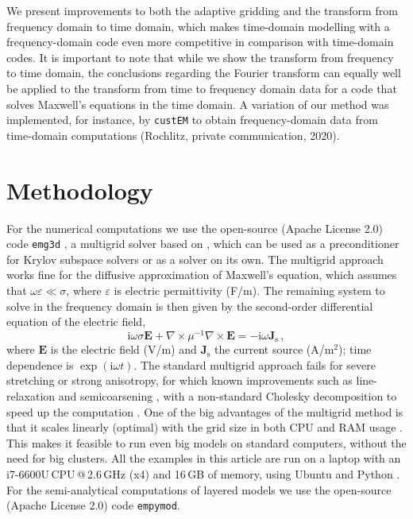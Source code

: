 \documentclass[onecolumn,extra,referee,camera]{gji}
\newcommand{\emg}[2]{\texttt{emg#1#2}\xspace}
\newcommand{\empymod}{\texttt{empymod}\xspace}
\newcommand{\custem}{\texttt{custEM}\xspace}
\begin{document}
We present improvements to both the adaptive gridding and the transform from
frequency domain to time domain, which makes time-domain modelling with a
frequency-domain code even more competitive in comparison with time-domain
codes. It is important to note that while we show the transform from frequency
to time domain, the conclusions regarding the Fourier transform can equally
well be applied to the transform from time to frequency domain data for a code
that solves Maxwell's equations in the time domain. A variation of our method
was implemented, for instance, by \custem \citep{GEO.19.Rochlitz} to obtain
frequency-domain data from time-domain computations (Rochlitz, private
communication, 2020).


\section{Methodology} %

For the numerical computations we use the open-source (Apache License 2.0) code
\emg3d \citep{JOSS.19.Werthmuller}, a multigrid solver based on
\cite{GP.06.Mulder}, which can be used as a preconditioner for Krylov subspace
solvers or as a solver on its own. The multigrid approach works fine for the
diffusive approximation of Maxwell's equation, which assumes that
$\omega\varepsilon \ll \sigma$, where $\varepsilon$ is electric permittivity
(F/m). The remaining system to solve in the frequency domain is then given by
the second-order differential equation of the electric field,
%
\begin{equation}
    \mathrm{i}\omega\sigma \mathbf{E} +
    \nabla \times \mu^{-1} \nabla \times \mathbf{E}
    = -\mathrm{i}\omega\mathbf{J}_\mathrm{s} \, ,
  \label{eq:maxwell}
\end{equation}
%
where $\mathbf{E}$ is the electric field (V/m) and $\mathbf{J}_\mathrm{s}$ the
current source (A/m$^2$); time dependence is $\exp(\mathrm{i}\omega t)$. The
standard multigrid approach fails for severe stretching or strong anisotropy,
for which \deleted{\emg3d has implemented }known improvements such as
line-relaxation and semicoarsening \citep{ECCFD.06.Jonsthovel} , with a non-standard Cholesky decomposition to speed up the
computation \citep{GEO.08.Mulder}. One of the big advantages of the multigrid
method is that it scales linearly (optimal) with the grid size in both CPU and
RAM usage \citep{B.Springer.20.Mulder}. This makes it feasible to run even big
models on standard computers, without the need for big clusters. All the
examples in this article are run on a laptop with an i7-6600U\,CPU\,@\,2.6\,GHz
(x4) and 16\,GB of memory, using Ubuntu  and Python
.  For the semi-analytical
computations of layered models we use the open-source (Apache License 2.0) code
\empymod \citep{GEO.17.Werthmuller}.
\end{document}
